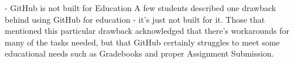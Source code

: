 



- GitHub is not built for Education
A few students described one drawback behind using GitHub for education - it's just not built for it. Those that mentioned this particular drawback acknowledged that there's workarounds for many of the tasks needed, but that GitHub certainly struggles to meet some educational needs such as Gradebooks and proper Assignment Submission. %




